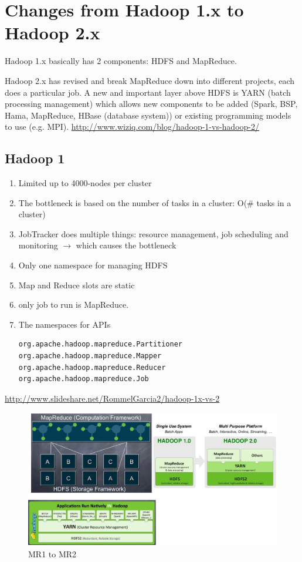 \section{Changes from Hadoop 1.x to Hadoop 2.x}
\label{sec:MR1_MR2}

Hadoop 1.x basically has 2 components: HDFS and MapReduce.

Hadoop 2.x has revised and break MapReduce down into different projects, each
does a particular job. A new and important layer above HDFS is YARN (batch
processing management) which allows new components to be added (Spark, BSP,
Hama, MapReduce, HBase (database system)) or existing programming models to use
(e.g. MPI). \url{http://www.wiziq.com/blog/hadoop-1-vs-hadoop-2/}

\subsection{Hadoop 1}

\begin{enumerate}
  \item Limited up to 4000-nodes per cluster
  \item The bottleneck is based on the number of tasks in a cluster: O(\# tasks
  in a cluster)
  
  \item JobTracker does multiple things: resource management, job scheduling and
  monitoring $\rightarrow$ which causes the bottleneck
  
  \item Only one namespace for managing HDFS
  \item Map and Reduce slots are static
  \item only job to run is MapReduce.
  
  \item The namespaces for APIs
\begin{verbatim}
org.apache.hadoop.mapreduce.Partitioner
org.apache.hadoop.mapreduce.Mapper
org.apache.hadoop.mapreduce.Reducer
org.apache.hadoop.mapreduce.Job
\end{verbatim} 
\end{enumerate}


\url{http://www.slideshare.net/RommelGarcia2/hadoop-1x-vs-2}

\begin{figure}[hbt]
  \centerline{\includegraphics[height=6cm,
    angle=0]{./images/MR1_MR2_comparison_01.eps}}
  \caption{MR1 to MR2}
  \label{fig:MR1_MR2_comparison_01}
\end{figure}



